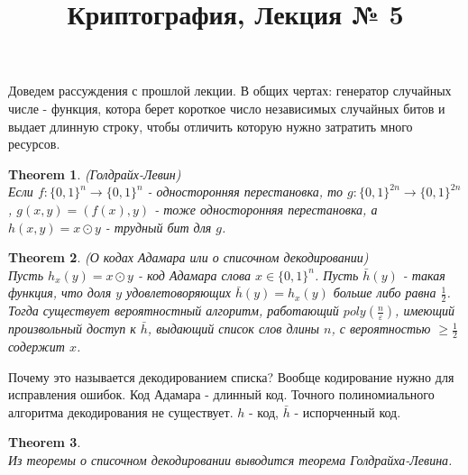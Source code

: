 \documentclass[a4paper]{article}
\title{Криптография, Лекция № 5}
\theoremstyle{definition}
\theoremstyle{plain}
\newtheorem{theorem}{Theorem}
\begin{document}
\maketitle

\noindent Доведем рассуждения с прошлой лекции. В общих чертах: генератор случайных числе - функция,
котора берет короткое число независимых случайных битов и выдает длинную строку, чтобы отличить
которую нужно затратить много ресурсов.~\\

\begin{theorem}(Голдрайх-Левин)~\\
	Если $f: \{0, 1\}^{n} \rightarrow \{0, 1\}^n$ - односторонняя перестановка, то
	$g: \{0, 1\}^{2n} \rightarrow \{0, 1\}^{2n}$, $g(x, y) = (f(x), y)$ - тоже односторонняя перестановка,
	а $h(x, y) = x \odot y$ - трудный бит для $g$.
\end{theorem}

\begin{theorem}(О кодах Адамара или о списочном декодировании)~\\
	Пусть $h_x(y) = x \odot y$ - код Адамара слова $x \in \{0, 1\}^n$.
	Пусть $\bar{h}(y)$ - такая функция, что доля $y$ удовлетоворяющих $\bar{h}(y) = h_x(y)$ больше либо равна $\frac{1}{2}$.
	Тогда существует вероятностный алгоритм, работающий $poly(\frac{n}{\varepsilon})$, имеющий
	произвольный доступ к $\bar{h}$, выдающий список слов длины $n$, с вероятностью $\ge \frac{1}{2}$
	содержит $x$.
\end{theorem}

\noindent Почему это называется декодированием списка? Вообще кодирование нужно для исправления ошибок. Код
Адамара - длинный код. Точного полиномиального алгоритма декодирования не существует.
$h$ - код, $\bar{h}$ - испорченный код.~\\

\begin{theorem}~\\
	Из теоремы о списочном декодировании выводится теорема Голдрайха-Левина.
\end{theorem}
\end{document}
